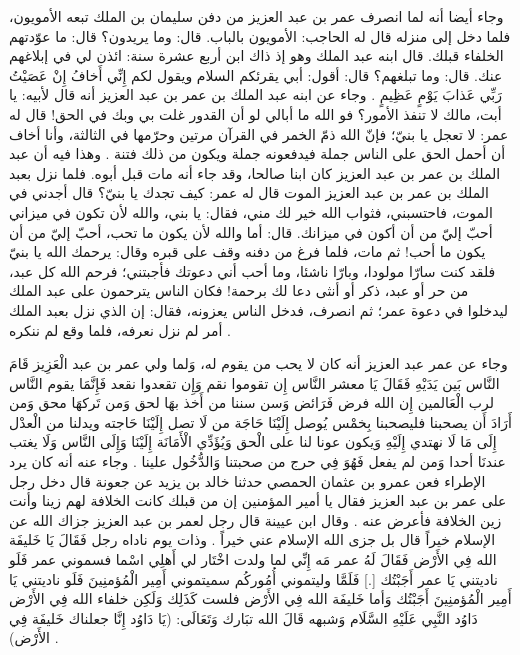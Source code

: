 وجاء أيضا أنه لما انصرف عمر بن عبد العزيز من دفن سليمان بن الملك تبعه الأمويون، فلما دخل إلى منزله قال له الحاجب: الأمويون بالباب. قال: وما يريدون؟ قال: ما عوّدتهم الخلفاء قبلك. قال ابنه عبد الملك وهو إذ ذاك ابن أربع عشرة سنة: ائذن لي في إبلاغهم عنك. قال: وما تبلغهم؟ قال: أقول: أبي يقرئكم السلام ويقول لكم إِنِّي أَخافُ إِنْ عَصَيْتُ رَبِّي عَذابَ يَوْمٍ عَظِيمٍ \cite{ibnAbdRabbih_AlIqd}. وجاء عن ابنه عبد الملك بن عمر بن عبد العزيز أنه قال لأبيه: يا أبت، مالك لا تنفذ الأمور؟ فو الله ما أبالي لو أن القدور غلت بي وبك في الحق! قال له عمر: لا تعجل يا بنيّ؛ فإنّ الله ذمّ الخمر في القرآن مرتين وحرّمها في الثالثة، وأنا أخاف أن أحمل الحق على الناس جملة فيدفعونه جملة ويكون من ذلك فتنة \cite{ibnAbdRabbih_AlIqd}. وهذا فيه أن عبد الملك بن عمر بن عبد العزيز كان ابنا صالحا، وقد جاء أنه مات قبل أبوه. فلما نزل بعبد الملك بن عمر بن عبد العزيز الموت قال له عمر: كيف تجدك يا بنيّ؟ قال أجدني في الموت، فاحتسبني، فثواب الله خير لك مني، فقال: يا بني، والله لأن تكون في ميزاني أحبّ إليّ من أن أكون في ميزانك. قال: أما والله لأن يكون ما تحب، أحبّ إليّ من أن يكون ما أحب! ثم مات، فلما فرغ من دفنه وقف على قبره وقال: يرحمك الله يا بنيّ فلقد كنت سارّا مولودا، وبارّا ناشئا، وما أحب أني دعوتك فأجبتني؛ فرحم الله كل عبد، من حر أو عبد، ذكر أو أنثى دعا لك برحمة! فكان الناس يترحمون على عبد الملك ليدخلوا في دعوة عمر؛ ثم انصرف، فدخل الناس يعزونه، فقال: إن الذي نزل بعبد الملك أمر لم نزل نعرفه، فلما وقع لم ننكره \cite{ibnAbdRabbih_AlIqd}.

وجاء عن عمر عبد العزيز أنه كان لا يحب من يقوم له، وَلما ولي عمر بن عبد الْعَزِيز قَامَ النَّاس بَين يَدَيْهِ فَقَالَ يَا معشر النَّاس إِن تقوموا نقم وَإِن تقعدوا نقعد فَإِنَّمَا يقوم النَّاس لرب الْعَالمين إِن الله فرض فَرَائض وَسن سننا من أَخذ بهَا لحق وَمن تَركهَا محق وَمن أَرَادَ أَن يصحبنا فليصحبنا بِخمْس يُوصل إِلَيْنَا حَاجَة من لَا تصل إِلَيْنَا حَاجته ويدلنا من الْعدْل إِلَى مَا لَا نهتدي إِلَيْهِ وَيكون عونا لنا على الْحق وَيُؤَدِّي الْأَمَانَة إِلَيْنَا وَإِلَى النَّاس وَلَا يغتب عندنَا أحدا وَمن لم يفعل فَهُوَ فِي حرج من صحبتنا وَالدُّخُول علينا \cite{ibnAbdAlHakam_OmarIbnAbdAlAziz}. وجاء عنه أنه كان يرد الإطراء فعن عمرو بن عثمان الحمصي حدثنا خالد بن يزيد عن جعونة قال دخل رجل على عمر بن عبد العزيز فقال يا أمير المؤمنين إن من قبلك كانت الخلافة لهم زينا وأنت زين الخلافة فأعرض عنه \cite{dahabi_Siyar}. وقال ابن عيينة قال رجل لعمر بن عبد العزيز جزاك الله عن الإسلام خيراً قال بل جزى الله الإسلام عني خيراً \cite{dahabi_Siyar}.  وذات يوم ناداه رجل فَقَالَ يَا خَليفَة الله فِي الأَرْض فَقَالَ لَهُ عمر مَه إِنِّي لما ولدت اخْتَار لي أَهلِي اسْما فسموني عمر فَلَو ناديتني يَا عمر أَجَبْتُك [.]  فَلَمَّا وليتموني أُمُوركُم سميتموني أَمِير الْمُؤمنِينَ فَلَو ناديتني يَا أَمِير الْمُؤمنِينَ أَجَبْتُك وَأما خَليفَة الله فِي الأَرْض فلست كَذَلِك وَلَكِن خلفاء الله فِي الأَرْض دَاوُد النَّبِي عَلَيْهِ السَّلَام وَشبهه قَالَ الله تبَارك وَتَعَالَى: (يَا دَاوُد إِنَّا جعلناك خَليفَة فِي الأَرْض) \cite{ibnAbdAlHakam_OmarIbnAbdAlAziz}.

